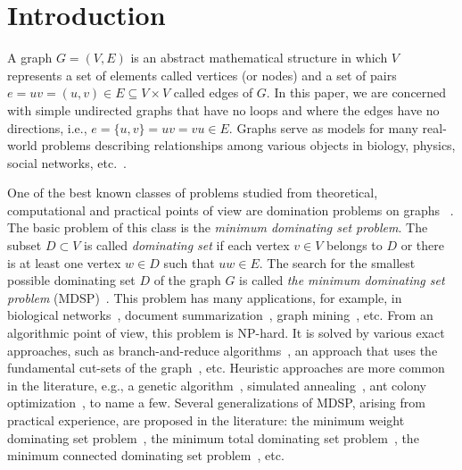 \documentclass[dvipsnames,format=sigconf]{acmart} %
\begin{document}
\maketitle

\section{Introduction}
A graph $G=(V,E)$ is an abstract mathematical structure 
in which $V$ represents a set of elements called vertices (or nodes) and a set of pairs $e = uv =(u, v)  \in E \subseteq V \times V$ called edges of $G$. In this paper, we are concerned with simple undirected graphs that have no loops and where the edges have no directions, i.e., $e = \{u,v\} = uv = vu \in E$.   Graphs serve as models for many real-world problems describing relationships among various objects in biology, physics, social networks,  etc.~\cite{mashaghi2004investigation,pirzada2007applications,shah2019characterizing,doi:10.1137/S0895480100375831}. 

One of the best known classes of problems studied from theoretical, computational and practical points of view are domination problems on graphs~ \cite{haynes2013fundamentals}. The basic problem of this class is the \textit{minimum dominating set problem}. The subset $D \subset V$ is called \emph{dominating set} if each vertex $v\in V$ belongs to $D$ or there is at least one vertex $w\in D$ such that $uw\in E$. The search for the smallest possible dominating set $D$ of the graph $G$ is called \emph{the minimum dominating set problem} (MDSP)~\cite{grandoni2006note}. This problem has many applications, for example, in biological networks~\cite{nacher2016minimum}, document summarization~\cite{shen2010multi}, graph mining~\cite{chalupa2018order}, etc. From an algorithmic point of view, this problem is NP-hard. It is solved by various exact approaches, such as branch-and-reduce algorithms~\cite{van2011exact}, an approach that uses the fundamental cut-sets of the graph~\cite{karci2020new}, etc. Heuristic approaches are more common in the literature, e.g., a genetic algorithm~\cite{hedar2010hybrid}, simulated annealing~\cite{hedar2012simulated}, ant colony optimization~\cite{ho2006enhanced}, to name a few. Several generalizations of MDSP, arising from practical experience, are proposed in the literature: the minimum weight dominating set problem~\cite{romania2010ant}, the minimum total dominating set problem~\cite{yuan2019novel}, the minimum connected dominating set problem~\cite{butenko2004new}, etc.
\end{document}
